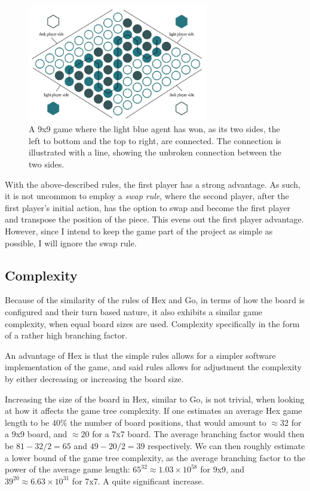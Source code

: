 \begin{figure}[ht]
	\centering
	\includegraphics[width=0.7\textwidth]{figures/hex-winning}
	\caption{A 9x9 game where the light blue agent has won, as its two sides, the left to bottom and the top to right, are connected. The connection is illustrated with a line, showing the unbroken connection between the two sides.}
	\label{fig-winning}
\end{figure}

With the above-described rules, the first player has a strong advantage. As such, it is not uncommon to employ a \textit{swap rule}, where the second player, after the first player's initial action, has the option to swap and become the first player and transpose the position of the piece. This evens out the first player advantage. However, since I intend to keep the game part of the project as simple as possible, I will ignore the swap rule.

\subsection{Complexity}
Because of the similarity of the rules of Hex and Go, in terms of how the board is configured and their turn based nature, it also exhibits a similar game complexity, when equal board sizes are used. Complexity specifically in the form of a rather high branching factor.

An advantage of Hex is that the simple rules allows for a simpler software implementation of the game, and said rules allows for adjustment the complexity by either decreasing or increasing the board size. 

Increasing the size of the board in Hex, similar to Go, is not trivial, when looking at how it affects the game tree complexity. If one estimates an average Hex game length to be $40\%$ the number of board positions, that would amount to $\approx 32$ for a 9x9 board, and $\approx 20$ for a 7x7 board. The average branching factor would then be $81 - 32 / 2 = 65$ and $49 - 20 / 2 = 39$ respectively. We can then roughly estimate a lower bound of the game tree complexity, as the average branching factor to the power of the average game length: $65^{32}\approx 1.03 \times 10^{58}$ for 9x9, and $39^{20} \approx 6.63 \times 10^{31}$ for 7x7. A quite significant increase.

